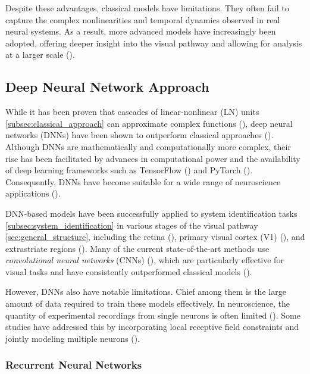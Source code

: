 Despite these advantages, classical models have limitations. They often fail to capture the complex nonlinearities and temporal dynamics observed in real neural systems. As a result, more advanced models have increasingly been adopted, offering deeper insight into the visual pathway and allowing for analysis at a larger scale (\citet{Maheswaranathan340943, Butts11313, keat2001predicting}).

\subsection{Deep Neural Network Approach}
\label{subsec:deep_learning_approach}

While it has been proven that cascades of linear-nonlinear (LN) units \ref{subsec:classical_approach} can approximate complex functions (\citet{cybenko1989approximation, HORNIK1991251}), deep neural networks (DNNs) have been shown to outperform classical approaches (\citet{MAL-006, Kriegeskorte2015dnn}). Although DNNs are mathematically and computationally more complex, their rise has been facilitated by advances in computational power and the availability of deep learning frameworks such as TensorFlow (\citet{TensorFlow}) and PyTorch (\citet{paszke2017automatic}). Consequently, DNNs have become suitable for a wide range of neuroscience applications (\citet{lecun2015deep}).

DNN-based models have been successfully applied to system identification tasks \ref{subsec:system_identification} in various stages of the visual pathway \ref{sec:general_structure}, including the retina (\citet{Maheswaranathan340943}), primary visual cortex (V1) (\citet{cadena2019conv, kindel2017usingdeeplearningreveal}), and extrastriate regions (\citet{zareh2024deep}). Many of the current state-of-the-art methods use \emph{convolutional neural networks} (CNNs) (\citet{NIPS2012_c399862d}), which are particularly effective for visual tasks and have consistently outperformed classical models (\citet{zhang2019convolutional, cadena2019conv}).

However, DNNs also have notable limitations. Chief among them is the large amount of data required to train these models effectively. In neuroscience, the quantity of experimental recordings from single neurons is often limited (\citet{zhang2019convolutional}). Some studies have addressed this by incorporating local receptive field constraints and jointly modeling multiple neurons (\citet{antolik2016local}).

\subsubsection{Recurrent Neural Networks}
\label{subsubsec:rnns}

